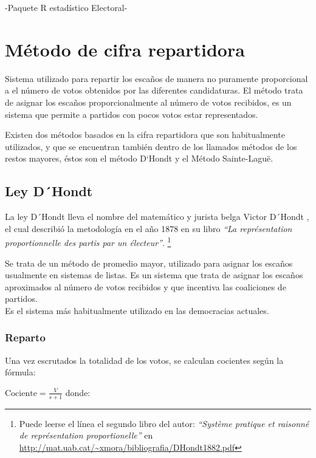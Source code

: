 \documentclass[12pt,a4paper,]{book}
\let\rmarkdownfootnote\footnote%
\def\footnote{\protect\rmarkdownfootnote}
\numberwithin{dummy}{section}
\theoremstyle{ocrenumbox}
\theoremstyle{blacknumex}
\theoremstyle{blacknumbox}
\theoremstyle{ocrenum}
\theoremstyle{ocrenum}
\begin{document}
-Paquete R estadístico Electoral-

\hypertarget{muxe9todo-de-cifra-repartidora}{%
\section{Método de cifra
repartidora}\label{muxe9todo-de-cifra-repartidora}}

Sistema utilizado para repartir los escaños de manera no puramente
proporcional a el número de votos obtenidos por las diferentes
candidaturas. El método trata de asignar los escaños proporcionalmente
al número de votos recibidos, es un sistema que permite a partidos con
pocos votos estar representados.

Existen dos métodos basados en la cifra repartidora que son
habitualmente utilizados, y que se encuentran también dentro de los
llamados métodos de los restos mayores, éstos son el método D`Hondt y el
Método Sainte-Laguë.

\hypertarget{ley-dhondt}{%
\subsection{Ley D´Hondt}\label{ley-dhondt}}

La ley D´Hondt lleva el nombre del matemático y jurista belga Victor
D´Hondt , el cual describió la metodología en el año 1878 en su libro
\emph{``La représentation proportionnelle des partis par un électeur''}.
\footnote{Puede leerse el línea el segundo libro del autor:
  \emph{``Système pratique et raisonné de représentation
  proportionelle''} en
  \url{http://mat.uab.cat/~xmora/bibliografia/DHondt1882.pdf}}

Se trata de un método de promedio mayor, utilizado para asignar los
escaños usualmente en sistemas de listas. Es un sistema que trata de
asignar los escaños aproximados al número de votos recibidos y que
incentiva las coaliciones de partidos.\\
Es el sistema más habitualmente utilizado en las democracias actuales.

\hypertarget{reparto}{%
\subsubsection{Reparto}\label{reparto}}

Una vez escrutados la totalidad de los votos, se calculan cocientes
según la fórmula:

\(\textrm{Cociente} = \frac{V}{s+1}\) donde:
\end{document}
